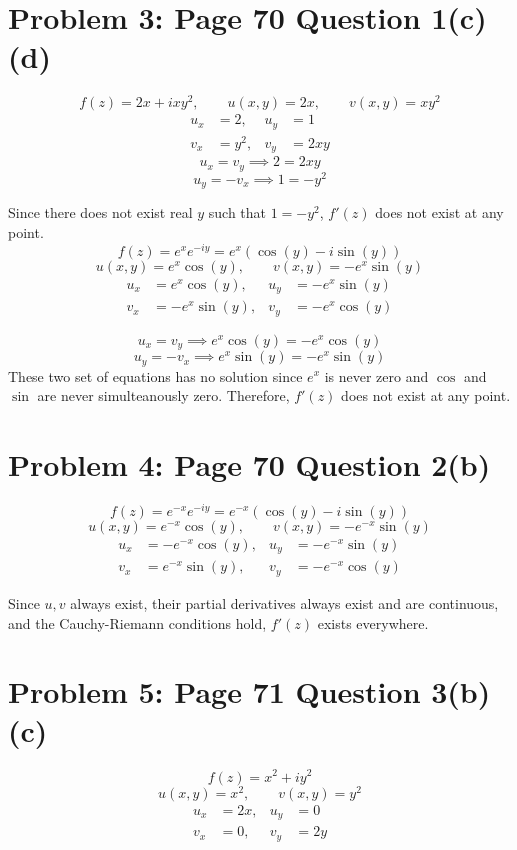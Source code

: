 \documentclass{article}
\begin{document}
\section*{Problem 3: Page 70 Question 1(c)(d)}
\[
	f(z) = 2x + ixy^2, \qquad u(x,y) = 2x, \qquad v(x,y) = xy^2
\]
\begin{equation*}
	\begin{aligned}
		u_x &= 2, & u_y &= 1 \\
		v_x &= y^2, & v_y &= 2xy
	\end{aligned}	
\end{equation*}
\[
	u_x = v_y \implies 2 = 2xy
\]
\[
	u_y = -v_x \implies 1 = -y^2 
\]

Since there does not exist real $y$ such that $1 = -y^2$,
$f'(z)$ does not exist at any point.
\[
	f(z) = e^{x}e^{-iy} = e^x(\cos(y) - i\sin(y))
\]
\[
	u(x,y) = e^x\cos(y), \qquad v(x,y) = -e^x\sin(y)
\]
\begin{equation*}
	\begin{aligned}
		u_x &= e^x\cos(y), & u_y &= -e^x\sin(y) \\
		v_x &= -e^x\sin(y), & v_y &= -e^x\cos(y)
	\end{aligned}	
\end{equation*}

\[
	u_x = v_y \implies e^x\cos(y) = -e^x\cos(y)
\]
\[
	u_y = -v_x \implies e^x\sin(y) = -e^x\sin(y)
\]
These two set of equations has no solution since $e^x$ is never zero 
and $\cos$ and $\sin$ are never simulteanously zero.
Therefore,
$f'(z)$ does not exist at any point.
\newpage 

\section*{Problem 4: Page 70 Question 2(b)}
\[
	f(z) = e^{-x}e^{-iy} = e^{-x}(\cos(y) - i\sin(y))
\]
\[
	u(x,y) = e^{-x}\cos(y), \qquad v(x,y) = -e^{-x}\sin(y)
\]
\begin{equation*}
	\begin{aligned}
		u_x &= -e^{-x}\cos(y), & u_y &= -e^{-x}\sin(y) \\
		v_x &= e^{-x}\sin(y), & v_y &= -e^{-x}\cos(y)
	\end{aligned}
\end{equation*}

Since $u, v$ always exist, their partial derivatives always exist and are continuous,
and the Cauchy-Riemann conditions hold, 
$f'(z)$ exists everywhere.
\newpage

\section*{Problem 5: Page 71 Question 3(b)(c)}
\[
	f(z) = x^2 + iy^2
\]
\[
	u(x,y) = x^2, \qquad v(x,y) = y^2
\]
\begin{equation*}
	\begin{aligned}
		u_x &= 2x, & u_y &= 0  \\
		v_x &= 0, & v_y &= 2y
	\end{aligned}
\end{equation*}
\end{document}
